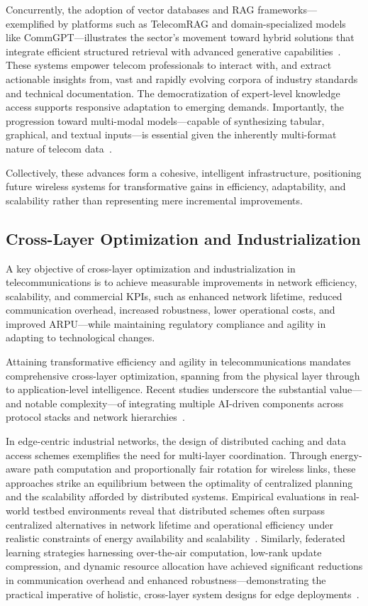\documentclass[sigconf]{acmart}
\begin{document}
Concurrently, the adoption of vector databases and RAG frameworks—exemplified by platforms such as TelecomRAG and domain-specialized models like CommGPT—illustrates the sector's movement toward hybrid solutions that integrate efficient structured retrieval with advanced generative capabilities~\cite{ref11,ref22,ref23,ref29}. These systems empower telecom professionals to interact with, and extract actionable insights from, vast and rapidly evolving corpora of industry standards and technical documentation. The democratization of expert-level knowledge access supports responsive adaptation to emerging demands. Importantly, the progression toward multi-modal models—capable of synthesizing tabular, graphical, and textual inputs—is essential given the inherently multi-format nature of telecom data~\cite{ref21,ref29}.

Collectively, these advances form a cohesive, intelligent infrastructure, positioning future wireless systems for transformative gains in efficiency, adaptability, and scalability rather than representing mere incremental improvements.

\subsection{Cross-Layer Optimization and Industrialization}

A key objective of cross-layer optimization and industrialization in telecommunications is to achieve measurable improvements in network efficiency, scalability, and commercial KPIs, such as enhanced network lifetime, reduced communication overhead, increased robustness, lower operational costs, and improved ARPU—while maintaining regulatory compliance and agility in adapting to technological changes.

Attaining transformative efficiency and agility in telecommunications mandates comprehensive cross-layer optimization, spanning from the physical layer through to application-level intelligence. Recent studies underscore the substantial value—and notable complexity—of integrating multiple AI-driven components across protocol stacks and network hierarchies~\cite{ref12, ref14, ref20, ref21, ref24, ref25, ref26, ref29}.

In edge-centric industrial networks, the design of distributed caching and data access schemes exemplifies the need for multi-layer coordination. Through energy-aware path computation and proportionally fair rotation for wireless links, these approaches strike an equilibrium between the optimality of centralized planning and the scalability afforded by distributed systems. Empirical evaluations in real-world testbed environments reveal that distributed schemes often surpass centralized alternatives in network lifetime and operational efficiency under realistic constraints of energy availability and scalability~\cite{ref14}. Similarly, federated learning strategies harnessing over-the-air computation, low-rank update compression, and dynamic resource allocation have achieved significant reductions in communication overhead and enhanced robustness—demonstrating the practical imperative of holistic, cross-layer system designs for edge deployments~\cite{ref12}.
\end{document}
